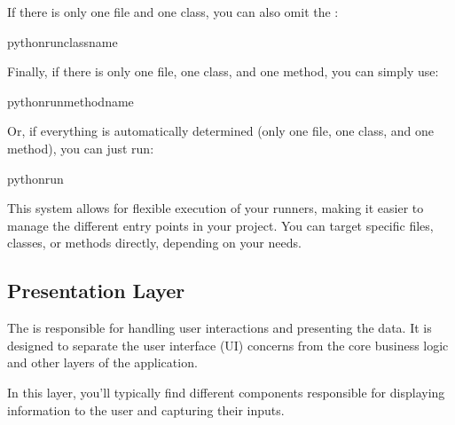 \documentclass[letterpaper,10pt,english]{sphinxhowto}
\begin{document}
\sphinxAtStartPar
If there is only one file and one class, you can also omit the :

\begin{sphinxVerbatim}[commandchars=\\\{\}]
pythonrunclass\PYGZus{}name
\end{sphinxVerbatim}

\sphinxAtStartPar
Finally, if there is only one file, one class, and one method, you can simply use:

\begin{sphinxVerbatim}[commandchars=\\\{\}]
pythonrunmethod\PYGZus{}name
\end{sphinxVerbatim}

\sphinxAtStartPar
Or, if everything is automatically determined (only one file, one class, and one method), you can just run:

\begin{sphinxVerbatim}[commandchars=\\\{\}]
pythonrun
\end{sphinxVerbatim}

\sphinxAtStartPar
This system allows for flexible execution of your runners, making it easier to manage the different entry points in your project. You can target specific files, classes, or methods directly, depending on your needs.

\sphinxstepscope


\subsection{Presentation Layer}
\label{\detokenize{architecture/presentation/index:presentation-layer}}\label{\detokenize{architecture/presentation/index::doc}}
\sphinxAtStartPar
The  is responsible for handling user interactions and presenting the data. It is designed to separate the user interface (UI) concerns from the core business logic and other layers of the application.

\sphinxAtStartPar
In this layer, you’ll typically find different components responsible for displaying information to the user and capturing their inputs.
\end{document}
